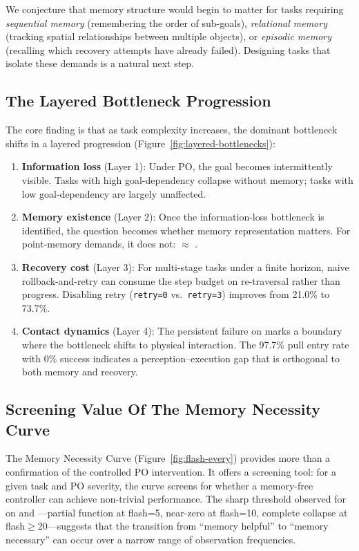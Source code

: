 We conjecture that memory structure would begin to matter for tasks requiring \emph{sequential memory} (remembering the order of sub-goals), \emph{relational memory} (tracking spatial relationships between multiple objects), or \emph{episodic memory} (recalling which recovery attempts have already failed). Designing tasks that isolate these demands is a natural next step.

\subsection{The Layered Bottleneck Progression}

The core finding is that as task complexity increases, the dominant bottleneck shifts in a layered progression (Figure~\ref{fig:layered-bottlenecks}):

\begin{enumerate}
\item \textbf{Information loss} (Layer 1): Under PO, the goal becomes intermittently visible. Tasks with high goal-dependency collapse without memory; tasks with low goal-dependency are largely unaffected.

\item \textbf{Memory existence} (Layer 2): Once the information-loss bottleneck is identified, the question becomes whether memory representation matters. For point-memory demands, it does not:  $\approx$ .

\item \textbf{Recovery cost} (Layer 3): For multi-stage tasks under a finite horizon, naive rollback-and-retry can consume the step budget on re-traversal rather than progress. Disabling retry (\texttt{retry=0} vs.\ \texttt{retry=3}) improves  from 21.0\% to 73.7\%.

\item \textbf{Contact dynamics} (Layer 4): The persistent failure on  marks a boundary where the bottleneck shifts to physical interaction. The 97.7\% pull entry rate with 0\% success indicates a perception--execution gap that is orthogonal to both memory and recovery.
\end{enumerate}

\subsection{Screening Value Of The Memory Necessity Curve}

The Memory Necessity Curve (Figure~\ref{fig:flash-every}) provides more than a confirmation of the controlled PO intervention. It offers a screening tool: for a given task and PO severity, the curve screens for whether a memory-free controller can achieve non-trivial performance. The sharp threshold observed for  on  and ---partial function at flash=5, near-zero at flash=10, complete collapse at flash$\geq$20---suggests that the transition from ``memory helpful'' to ``memory necessary'' can occur over a narrow range of observation frequencies.

